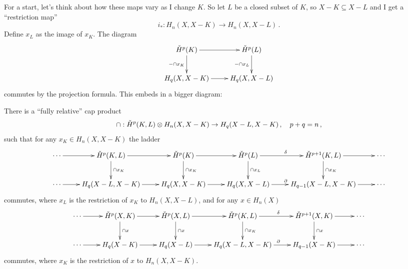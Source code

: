 For a start, let's think about how these maps vary as I change $K$.
So let $L$ be a closed subset of $K$, so $X-K\subseteq X-L$ and I get 
a ``restriction map''
\[
i_\ast:H_n(X,X-K)\to H_n(X,X-L)\,.
\]
Define $x_L$ as the image of $x_K$. The diagram
\begin{equation*}
\xymatrix{
\cHH^p(K)\ar[r]\ar[d]_{-\cap x_K} & \cHH^p(L) \ar[d]_{-\cap x_L} \\
H_q(X,X-K)\ar[r] & H_q(X,X-L)
}
\end{equation*}
commutes by the projection formula. This embeds in a bigger diagram:
\begin{theorem}
There is a ``fully relative'' cap product
\[
\cap:\check{H}^p(K,L)\otimes H_n(X,X-K)\to H_q(X-L,X-K)\,,\quad p+q=n\,,
\]
such that for any $x_K\in H_n(X,X-K)$ the ladder
\begin{equation*}
\xymatrix{
\cdots \ar[r] & \cHH^p(K,L)\ar[r]\ar[d]^{\cap x_{K}} & \cHH^p(K)\ar[r]\ar[d]^{\cap x_K} & \cHH^p(L)\ar[r]^\delta\ar[d]^{\cap x_L} & \cHH^{p+1}(K,L)\ar[r]\ar[d]^{\cap x_{K}} & \cdots\\
	\cdots\ar[r] & H_q(X-L,X-K)\ar[r]& H_q(X,X-K)\ar[r] & H_q(X,X-L)\ar[r]^\partial & H_{q-1}(X-L,X-K)\ar[r] & \cdots
}
\end{equation*}
commutes, where $x_L$ is the restriction of $x_K$ to $H_n(X,X-L)$, 
and for any $x\in H_n(X)$
\[
\xymatrix{
\cdots \ar[r] & \cHH^p(X,K) \ar[d]^{\cap x} \ar[r] & 
\cHH^p(X,L) \ar[d]^{\cap x} \ar[r] & 
\cHH^p(K,L) \ar[d]^{\cap x_K} \ar[r]^\delta &
\cHH^{p+1}(X,K) \ar[d]^{\cap x} \ar[r] & \cdots\\
\cdots \ar[r] & H_q(X-K) \ar[r] & H_q(X-L) \ar[r] & 
H_q(X-L,X-K) \ar[r]^\partial & H_{q-1}(X-K) \ar[r] & \cdots
}\]
commutes, where $x_K$ is the restriction of $x$ to $H_n(X,X-K)$. 
\end{theorem}
